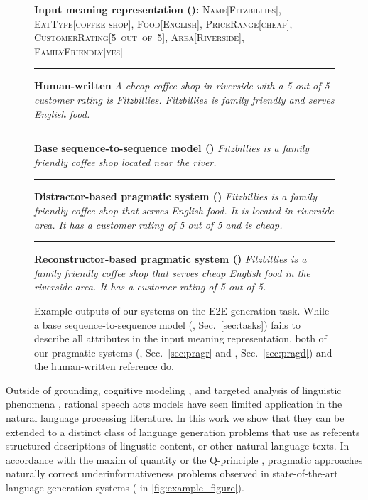 \documentclass[11pt,a4paper]{article}
\newcommand{\basespk}[0]{\xspace}
\newcommand{\pragd}[0]{\xspace}
\newcommand{\pragr}[0]{\xspace}
\begin{document}
\begin{figure}[t]
\begin{boxedminipage}{\columnwidth}
\scriptsize
\textbf{Input meaning representation ():}
\newline
\textsc{Name[Fitzbillies], EatType[coffee shop],  Food[English], PriceRange[cheap], CustomerRating[5~out~of~5], Area[Riverside], FamilyFriendly[yes]}
\newline \rule{\columnwidth}{1.2pt}
\textbf{Human-written}
\newline
\emph{A cheap coffee shop in riverside with a 5 out of 5 customer rating is Fitzbillies. Fitzbillies is family friendly and serves English food.}
\newline \rule{\columnwidth}{0.4pt}
\textbf{Base sequence-to-sequence model ()}
\newline
\emph{Fitzbillies is a family friendly coffee shop located near the river.}
\newline \rule{\columnwidth}{0.4pt}
\textbf{Distractor-based pragmatic system ()}
\newline
\emph{Fitzbillies is a family friendly coffee shop that serves English food. It is located in riverside area. It has a customer rating of 5 out of 5 and is cheap.}
\newline \rule{\columnwidth}{0.4pt}
\textbf{Reconstructor-based pragmatic system ()}
\newline
\emph{Fitzbillies is a family friendly coffee shop that serves cheap English food in the riverside area. It has a customer rating of 5 out of 5.}
\end{boxedminipage}
\caption{
\label{fig:example_figure}
Example outputs of our systems on the E2E generation task. While a base sequence-to-sequence model (\basespk, Sec.\ \ref{sec:tasks}) fails to describe all attributes in the input meaning representation, both of our pragmatic systems (\pragr, Sec.\ \ref{sec:pragr} and \pragd, Sec.\ \ref{sec:pragd}) and the human-written reference do.
\vspace{-1em}
}
\end{figure}


 
Outside of grounding, cognitive modeling \cite{Frank09PragmaticExperiments}, and targeted analysis of linguistic phenomena \cite{orita2015discourse}, rational speech acts models have seen limited application in the natural language processing
literature. In this work we show that they can be extended to a distinct class
of language generation problems that use as referents structured descriptions 
of lingustic content, or other natural language texts.
In accordance with the maxim of quantity \cite{Grice70Conversation} or the Q-principle \cite{Horn84Taxonomy},
pragmatic approaches naturally correct underinformativeness problems 
observed in state-of-the-art language generation systems ( in \autoref{fig:example_figure}).
\end{document}
